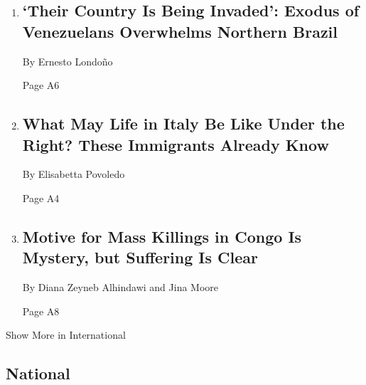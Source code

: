 \begin{enumerate}
\def\labelenumi{\arabic{enumi}.}
\item
  \href{/2018/04/28/world/americas/venezuela-brazil-migrants.html}{}

  \hypertarget{their-country-is-being-invaded-exodus-of-venezuelans-overwhelms-northern-brazil-1}{%
  \subsection{`Their Country Is Being Invaded': Exodus of Venezuelans
  Overwhelms Northern
  Brazil}\label{their-country-is-being-invaded-exodus-of-venezuelans-overwhelms-northern-brazil-1}}

  By Ernesto Londoño

  Page A6
\item
  \href{/2018/04/29/world/europe/italy-migrants-sesto-san-giovanni.html}{}

  \hypertarget{what-may-life-in-italy-be-like-under-the-right-these-immigrants-already-know}{%
  \subsection{What May Life in Italy Be Like Under the Right? These
  Immigrants Already
  Know}\label{what-may-life-in-italy-be-like-under-the-right-these-immigrants-already-know}}

  By Elisabetta Povoledo

  Page A4
\item
  \href{/2018/04/28/world/africa/congo-ituri-joseph-kabila.html}{}

  \hypertarget{motive-for-mass-killings-in-congo-is-mystery-but-suffering-is-clear-1}{%
  \subsection{Motive for Mass Killings in Congo Is Mystery, but
  Suffering Is
  Clear}\label{motive-for-mass-killings-in-congo-is-mystery-but-suffering-is-clear-1}}

  By Diana Zeyneb Alhindawi and Jina Moore

  Page A8
\end{enumerate}

Show More in International

\hypertarget{national}{%
\subsection{National}\label{national}}

